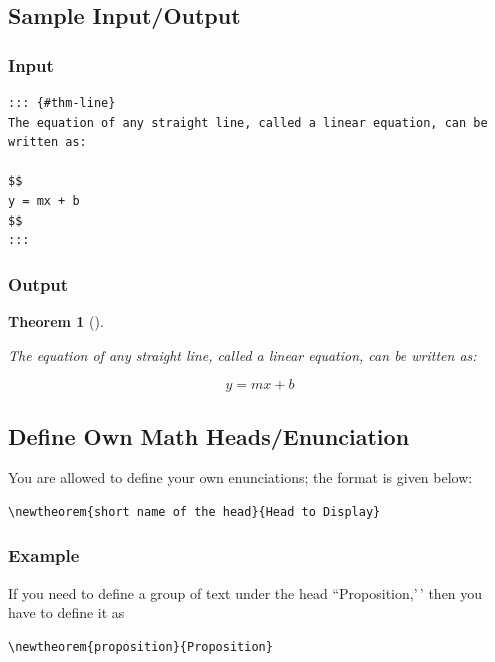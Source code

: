 \documentclass[]{imag-ms-template}
\theoremstyle{plain}
\newtheorem{theorem}{Theorem}[section]
\theoremstyle{remark}
\begin{document}
\subsection*{Sample Input/Output}\label{sample-inputoutput}

\subsubsection*{Input}\label{input}

\begin{verbatim}
::: {#thm-line}
The equation of any straight line, called a linear equation, can be written as:

$$
y = mx + b
$$
:::
\end{verbatim}

\subsubsection*{Output}\label{output-5}

\begin{theorem}[]\protect\hypertarget{thm-line}{}\label{thm-line}

The equation of any straight line, called a linear equation, can be
written as:

\[
y = mx + b
\]

\end{theorem}

\subsection{Define Own Math
Heads/Enunciation}\label{define-own-math-headsenunciation}

You are allowed to define your own enunciations; the format is given
below:

\begin{verbatim}
\newtheorem{short name of the head}{Head to Display}
\end{verbatim}

\subsubsection*{Example}\label{example}

If you need to define a group of text under the head ``Proposition,'\,'
then you have to define it as

\begin{verbatim}
\newtheorem{proposition}{Proposition}
\end{verbatim}
\end{document}
